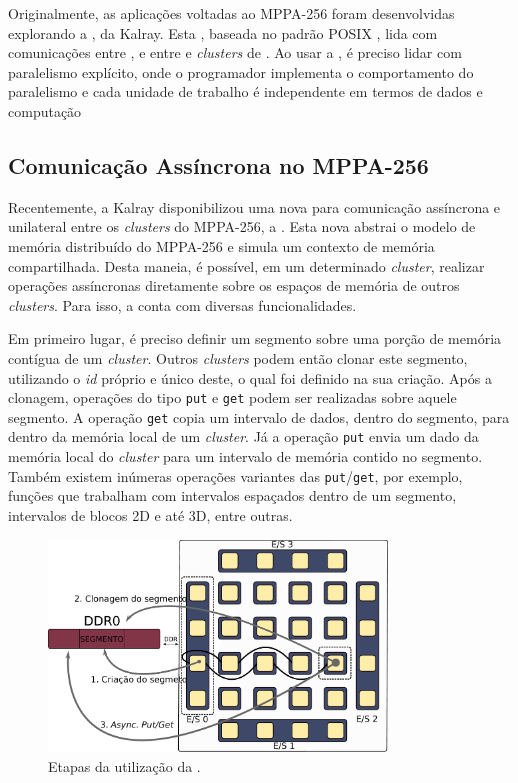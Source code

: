 \documentclass[a4paper,11pt]{article}
\newcommand{\mppa}{MPPA-256\xspace}
\begin{document}
Originalmente, as aplicações voltadas ao \mppa foram desenvolvidas explorando a \api \ipc, da Kalray. Esta \api, baseada no padrão POSIX \ipc, lida com comunicações entre \ccs, e entre \ccs e \textit{clusters} de \io. Ao usar a \ipc, é preciso lidar com paralelismo explícito, onde o programador implementa o comportamento do paralelismo e cada unidade de trabalho é independente em termos de dados e computação \cite{Castro-Souza-CCPE:2016}


\subsection{Comunicação Assíncrona no \mppa}
\label{subsec:async}

Recentemente, a Kalray disponibilizou uma nova \api para comunicação assíncrona e unilateral entre os \textit{clusters} do \mppa, a \async. Esta nova \api abstrai o modelo de memória distribuído do \mppa e simula um contexto de memória compartilhada. Desta maneia, é possível, em um determinado \textit{cluster}, realizar operações assíncronas diretamente sobre os espaços de memória de outros \textit{clusters}. Para isso, a \api conta com diversas funcionalidades.

Em primeiro lugar, é preciso definir um segmento sobre uma porção de memória contígua de um \textit{cluster}. Outros \textit{clusters} podem então clonar este segmento, utilizando o \textit{id} próprio e único deste, o qual foi definido na sua criação. Após a clonagem, operações do tipo \texttt{put} e \texttt{get} podem ser realizadas sobre aquele segmento. A operação \texttt{get} copia um intervalo de dados, dentro do segmento, para dentro da memória local de um \textit{cluster}. Já a operação \texttt{put} envia um dado da memória local do \textit{cluster} para um intervalo de memória contido no segmento. Também existem inúmeras operações variantes das \texttt{put}/\texttt{get}, por exemplo, funções que trabalham com intervalos espaçados dentro de um segmento, intervalos de blocos 2D e até 3D, entre outras.

\begin{figure}[h]
\centering
\includegraphics[width=9cm, keepaspectratio]{figs/putget.pdf}
\caption{Etapas da utilização da \api \async.}\par
\label{fig:asyncOverview}
\end{figure}
\end{document}

